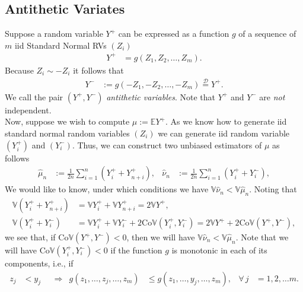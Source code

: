 \documentclass[12pt]{book}
\numberwithin{equation}{chapter}
\theoremstyle{plain}
\numberwithin{theorem}{section}
\theoremstyle{definition}
\numberwithin{exercise}{chapter}
\newcommand{\<}{\langle}
\renewcommand{\>}{\rangle}
\renewcommand{\(}{\left(}
\renewcommand{\)}{\right)}
\renewcommand{\[}{\left[}
\renewcommand{\]}{\right]}
\newcommand\Eb{\mathds{E}}
\newcommand\Vb{\mathds{V}}
\newcommand\Dc{\mathscr{D}}
\newcommand\sig{\sigma}
\newcommand\Xh{\widehat{X}}
\newcommand\nuh{\widehat{\nu}}
\newcommand\muh{\widehat{\mu}}
\begin{document}
\subsection{Antithetic Variates}
Suppose a random variable $Y^+$ can be expressed as a function $g$ of a sequence of $m$ iid Standard Normal RVs $(Z_i)$
\begin{align}
Y^+ 
	&=	g(Z_1, Z_2, \ldots, Z_m).
\end{align}
Because $Z_i \sim - Z_i$ it follows that
\begin{align}
Y^-
	&:= g(-Z_1, -Z_2, \ldots, -Z_m)
	\stackrel{\Dc}{=} Y^+ .
\end{align}
We call the pair $(Y^+,Y^-)$ \emph{antithetic variables}.  Note that $Y^+$ and $Y^-$ are \emph{not} independent.
\\[0.5em]
Now, suppose we wish to compute $\mu := \Eb Y^+$.
As we know how to generate iid standard normal random variables $(Z_i)$ we can generate iid random variable $(Y_i^+)$ and $(Y_i^-)$.  
Thus, we can construct two unbiased estimators of $\mu$ as follows
\begin{align}
\muh_n
	&:=	\frac{1}{2n} \sum_{i=1}^{n} ( Y_i^+ + Y_{n+i}^+ ) , &
\nuh_n
	&:=	\frac{1}{2n} \sum_{i=1}^{n} ( Y_i^+ + Y_i^- ) ,
\end{align}
We would like to know, under which conditions we have $\Vb \nuh_n < \Vb \muh_n$.
Noting that
\begin{align}
\Vb (  Y_i^+ + Y_{n+i}^+ )
	&=	\Vb Y_i^+ + \Vb Y_{n+i} ^+
	=		2 \Vb Y^+ , \\
\Vb (  Y_i^+ + Y_i^- )
	&=	 \Vb Y_i^+ + \Vb Y_i^- + 2 \text{Co}\Vb( Y_i^+,Y_i^- ) 
	 =		2 \Vb Y^+ + 2 \text{Co}\Vb( Y^+,Y^- ) ,
\end{align}
we see that, if $\text{Co}\Vb( Y^+,Y^- ) < 0$, then we will have $\Vb \nuh_n < \Vb \muh_n$.  Note that we will have $\text{Co}\Vb( Y_i^+,Y_i^- ) < 0$ if the function $g$ is monotonic in each of its components, i.e., if 
\begin{align}
z_j
	&< y_j &
	&\Rightarrow&
g(z_1, \ldots, z_j, \ldots, z_m)
	&\leq g(z_1, \ldots, y_j, \ldots, z_m) , &
\forall \, j 
	&= 1, 2, \ldots m .
\end{align}
\end{document}
